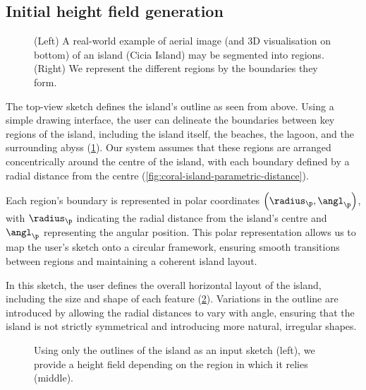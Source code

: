 \subsection{Initial height field generation}
\label{sec:coral-island-generation-initial}

\begin{figure}[H]
    \caption{(Left) A real-world example of aerial image (and 3D visualisation on bottom) of an island (Cicia Island) may be segmented into regions. (Right) We represent the different regions by the boundaries they form.}
    \label{fig:coral-island-top-view-sketch}
\end{figure}

The top-view sketch defines the island's outline as seen from above. Using a simple drawing interface, the user can delineate the boundaries between key regions of the island, including the island itself, the beaches, the lagoon, and the surrounding abyss (\cref{fig:coral-island-top-view-sketch}). Our system assumes that these regions are arranged concentrically around the centre of the island, with each boundary defined by a radial distance from the centre (\cref{fig:coral-island-parametric-distance}).

Each region's boundary is represented in polar coordinates $\left(\radius_\p, \angl_\p\right)$, with $\radius_\p$ indicating the radial distance from the island's centre and $\angl_\p$ representing the angular position. This polar representation allows us to map the user's sketch onto a circular framework, ensuring smooth transitions between regions and maintaining a coherent island layout.

In this sketch, the user defines the overall horizontal layout of the island, including the size and shape of each feature (\cref{fig:coral-island-procedural-height-only}). Variations in the outline are introduced by allowing the radial distances to vary with angle, ensuring that the island is not strictly symmetrical and introducing more natural, irregular shapes.

\begin{figure}[H]
    \caption{Using only the outlines of the island as an input sketch (left), we provide a height field depending on the region in which it relies (middle).}
    \label{fig:coral-island-procedural-height-only}
\end{figure}

